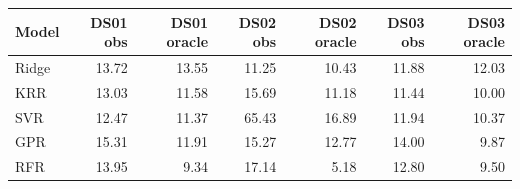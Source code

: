 \begin{tabular}{lrrrrrr}
\toprule
Model & DS01 obs & DS01 oracle & DS02 obs & DS02 oracle & DS03 obs & DS03 oracle \\
\midrule
Ridge & 13.72 & 13.55 & 11.25 & 10.43 & 11.88 & 12.03 \\
KRR & 13.03 & 11.58 & 15.69 & 11.18 & 11.44 & 10.00 \\
SVR & 12.47 & 11.37 & 65.43 & 16.89 & 11.94 & 10.37 \\
GPR & 15.31 & 11.91 & 15.27 & 12.77 & 14.00 & 9.87 \\
RFR & 13.95 & 9.34 & 17.14 & 5.18 & 12.80 & 9.50 \\
\bottomrule
\end{tabular}
